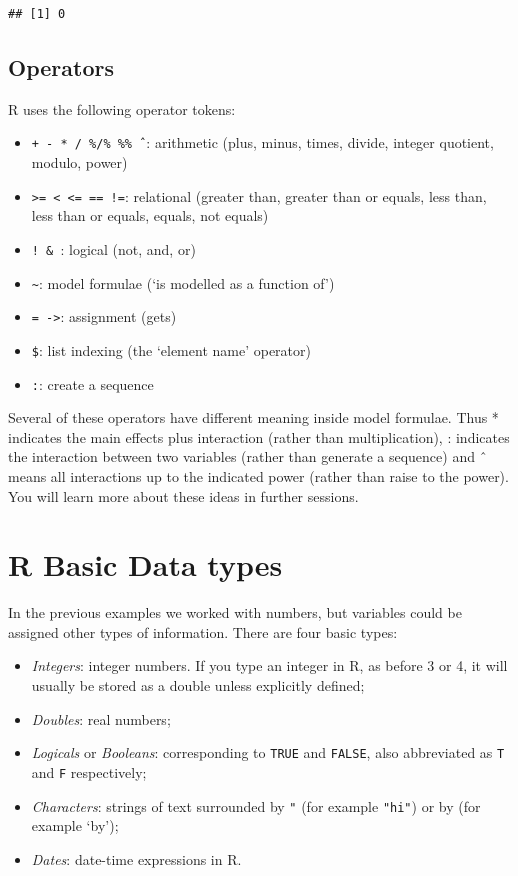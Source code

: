 \documentclass[
]{book}
\providecommand{\tightlist}{%
  \setlength{\itemsep}{0pt}\setlength{\parskip}{0pt}}
\theoremstyle{definition}
\theoremstyle{definition}
\theoremstyle{definition}
\theoremstyle{definition}
\theoremstyle{remark}
\begin{document}
\begin{verbatim}
## [1] 0
\end{verbatim}

\hypertarget{operators}{%
\subsection{Operators}\label{operators}}

R uses the following operator tokens:

\begin{itemize}
\tightlist
\item
  \texttt{+\ -\ *\ /\ \%/\%\ \%\%\ ˆ}: arithmetic (plus, minus, times, divide, integer quotient, modulo, power)
\item
  \texttt{\textgreater{}=\ \textless{}\ \textless{}=\ ==\ !=}: relational (greater than, greater than or equals, less than, less than or equals, equals, not equals)
\item
  \texttt{!\ \&\ \textbar{}}: logical (not, and, or)
\item
  \texttt{\textasciitilde{}}: model formulae (`is modelled as a function of')
\item
  \texttt{=\ -\textgreater{}}: assignment (gets)
\item
  \texttt{\$}: list indexing (the `element name' operator)
\item
  \texttt{:}: create a sequence
\end{itemize}

Several of these operators have different meaning inside model formulae. Thus * indicates the main effects plus interaction (rather than multiplication), : indicates the interaction between two variables (rather than generate a sequence) and ˆ means all interactions up to the indicated power (rather than raise to the power). You will learn more about these ideas in further sessions.

\hypertarget{r-basic-data-types}{%
\section{R Basic Data types}\label{r-basic-data-types}}

In the previous examples we worked with numbers, but variables could be assigned other types of information. There are four basic types:

\begin{itemize}
\item
  \emph{Integers}: integer numbers. If you type an integer in R, as before 3 or 4, it will usually be stored as a double unless explicitly defined;
\item
  \emph{Doubles}: real numbers;
\item
  \emph{Logicals} or \emph{Booleans}: corresponding to \texttt{TRUE} and \texttt{FALSE}, also abbreviated as \texttt{T} and \texttt{F} respectively;
\item
  \emph{Characters}: strings of text surrounded by \texttt{"} (for example \texttt{"hi"}) or by \texttt{\textquotesingle{}} (for example `by');
\item
  \emph{Dates}: date-time expressions in R.
\end{itemize}
\end{document}
